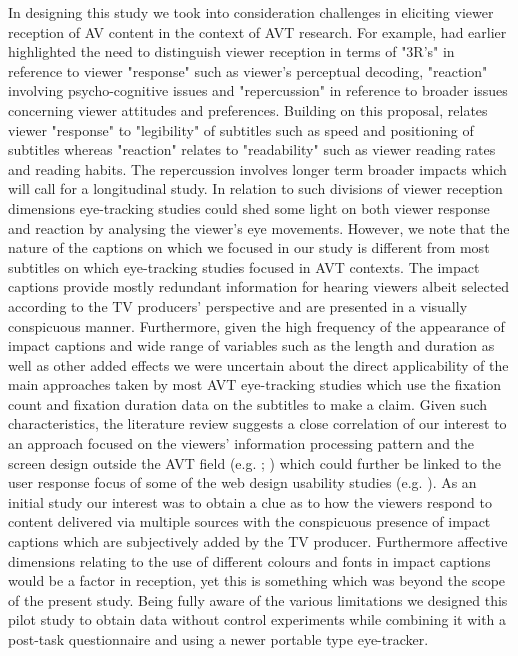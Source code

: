\documentclass[output=paper]{langsci/langscibook}
\begin{document}
In designing this study we took into consideration challenges in eliciting viewer reception of AV content in the context of AVT research.  For example, \citet{kovacic1995} had earlier highlighted the need to distinguish viewer reception in terms of "3R's" in reference to viewer "response" such as viewer's perceptual decoding, "reaction" involving psycho-cognitive issues and "repercussion" in reference to broader issues concerning viewer attitudes and preferences. Building on this proposal, \citet[pp. 56--57]{gambier2013} relates viewer "response" to "legibility" of subtitles such as speed and positioning of subtitles whereas "reaction" relates to "readability" such as viewer reading rates and reading habits. The repercussion involves longer term broader impacts which will call for a longitudinal study.  In relation to such divisions of viewer reception dimensions eye-tracking studies could shed some light on both viewer response and reaction by analysing the viewer's eye movements.  However, we note that the nature of the captions on which we focused in our study is different from most subtitles on which eye-tracking studies focused in AVT contexts. The impact captions provide mostly redundant information for hearing viewers albeit selected according to the TV producers' perspective and are presented in a visually conspicuous manner. Furthermore, given the high frequency of the appearance of impact captions and wide range of variables such as the length and duration as well as other added effects we were uncertain about the direct applicability of the main approaches taken by most AVT eye-tracking studies which use the fixation count and fixation duration data on the subtitles to make a claim.  Given such characteristics, the literature review suggests a close correlation of our interest to an approach focused on the viewers' information processing pattern and the screen design outside the AVT field (e.g. \citet{josephson2006}; \citet{Matsukawa2009}) which could further be linked to the user response focus of some of the web design usability studies (e.g. \citet{Nielsen2010}). As an initial study our interest was to obtain a clue as to how the viewers respond to content delivered via multiple sources with the conspicuous presence of impact captions which are subjectively added by the TV producer. Furthermore affective dimensions relating to the use of different colours and fonts in impact captions would be a factor in reception, yet this is something which was beyond the scope of the present study. Being fully aware of the various limitations we designed this pilot study to obtain data without control experiments while combining it with a post-task questionnaire and using a newer portable type eye-tracker. 
\end{document}
